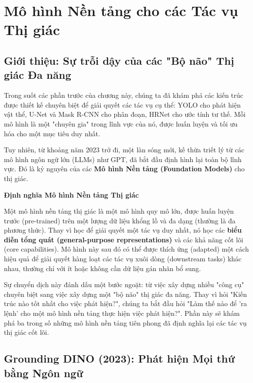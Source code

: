 \section{Mô hình Nền tảng cho các Tác vụ Thị giác}
\label{sec:foundation_models_vision_tasks}

\subsection{Giới thiệu: Sự trỗi dậy của các "Bộ não" Thị giác Đa năng}
\label{subsec:foundation_models_intro}
Trong suốt các phần trước của chương này, chúng ta đã khám phá các kiến trúc được thiết kế chuyên biệt để giải quyết các tác vụ cụ thể: YOLO cho phát hiện vật thể, U-Net và Mask R-CNN cho phân đoạn, HRNet cho ước tính tư thế. Mỗi mô hình là một "chuyên gia" trong lĩnh vực của nó, được huấn luyện và tối ưu hóa cho một mục tiêu duy nhất.

Tuy nhiên, từ khoảng năm 2023 trở đi, một làn sóng mới, kế thừa triết lý từ các mô hình ngôn ngữ lớn (LLMs) như GPT, đã bắt đầu định hình lại toàn bộ lĩnh vực. Đó là kỷ nguyên của các \textbf{Mô hình Nền tảng (Foundation Models)} cho thị giác.

\begin{mdframed}[style=infobox]
	\textbf{Định nghĩa Mô hình Nền tảng Thị giác}
	
	Một mô hình nền tảng thị giác là một mô hình quy mô lớn, được huấn luyện trước (pre-trained) trên một lượng dữ liệu khổng lồ và đa dạng (thường là đa phương thức). Thay vì học để giải quyết một tác vụ duy nhất, nó học các \textbf{biểu diễn tổng quát (general-purpose representations)} và các khả năng cốt lõi (core capabilities). Mô hình này sau đó có thể được thích ứng (adapted) một cách hiệu quả để giải quyết hàng loạt các tác vụ xuôi dòng (downstream tasks) khác nhau, thường chỉ với ít hoặc không cần dữ liệu gán nhãn bổ sung.
\end{mdframed}

Sự chuyển dịch này đánh dấu một bước ngoặt: từ việc xây dựng nhiều "công cụ" chuyên biệt sang việc xây dựng một "bộ não" thị giác đa năng. Thay vì hỏi "Kiến trúc nào tốt nhất cho việc phát hiện?", chúng ta bắt đầu hỏi "Làm thế nào để 'ra lệnh' cho một mô hình nền tảng thực hiện việc phát hiện?". Phần này sẽ khám phá ba trong số những mô hình nền tảng tiên phong đã định nghĩa lại các tác vụ thị giác cốt lõi.

\subsection{Grounding DINO (2023): Phát hiện Mọi thứ bằng Ngôn ngữ}
\label{subsec:grounding_dino}


